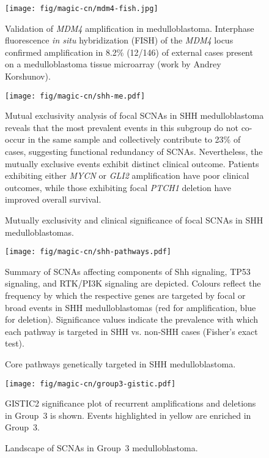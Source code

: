\documentclass[11pt,letterpaper]{article}
\theoremstyle{definition}
\begin{document}
\begin{SCfigure}
	\centering
	\texttt{[image: fig/magic-cn/mdm4-fish.jpg]}
	\caption{Validation of \emph{MDM4} amplification in medulloblastoma.
	Interphase fluorescence \emph{in situ} hybridization (FISH) of the \emph{MDM4} locus confirmed amplification in 8.2\% (12/146) of external cases present on a medulloblastoma tissue microarray (work by Andrey Korshunov).}
	\label{fig:mdm4-fish}
\end{SCfigure}

\clearpage

\begin{figure}[h]
	\begin{center}
		\texttt{[image: fig/magic-cn/shh-me.pdf]}
	\end{center}
	\caption{Mutually exclusivity and clinical significance of focal SCNAs in SHH medulloblastomas.}
	Mutual exclusivity analysis of focal SCNAs in SHH medulloblastoma reveals that the most prevalent events in this subgroup do not co-occur in the same sample and collectively contribute to 23\% of cases, suggesting functional redundancy of SCNAs. Nevertheless, the mutually exclusive events exhibit distinct clinical outcome. Patients exhibiting either \emph{MYCN} or \emph{GLI2} amplification have poor clinical outcomes, while those exhibiting focal \emph{PTCH1} deletion have improved overall survival.
	\label{fig:shh-me}
\end{figure}

\begin{figure}[h]
	\begin{center}
		\texttt{[image: fig/magic-cn/shh-pathways.pdf]}
	\end{center}
	\caption{Core pathways genetically targeted in SHH medulloblastoma.}
	Summary of SCNAs affecting components of Shh signaling, TP53 signaling, and RTK/PI3K signaling are depicted. Colours reflect the frequency by which the respective genes are targeted by focal or broad events in SHH medulloblastomas (red for amplification, blue for deletion). Significance values indicate the prevalence with which each pathway is targeted in SHH vs. non-SHH cases (Fisher's exact test).
	\label{fig:shh-pathways}
\end{figure}

\clearpage

\begin{figure}[h]
	\begin{center}
		\texttt{[image: fig/magic-cn/group3-gistic.pdf]}
	\end{center}
	\caption{Landscape of SCNAs in Group~3 medulloblastoma.}
	GISTIC2 significance plot of recurrent amplifications and deletions in Group~3 is shown. Events highlighted in yellow are enriched in Group~3.
	\label{fig:group3-gistic}
\end{figure}
\end{document}
